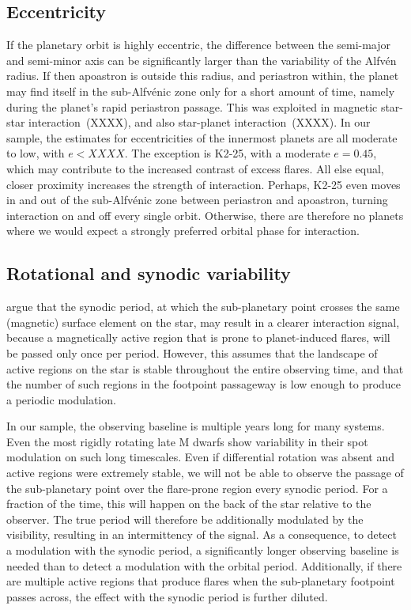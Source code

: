 \documentclass[twocolumn]{aastex631}
\begin{document}
\subsection{Eccentricity}
\label{sec:discussion:eccentricity}
If the planetary orbit is highly eccentric, the difference between the semi-major and semi-minor axis can be significantly larger than the variability of the Alfv\'en radius. If then apoastron is outside this radius, and periastron within, the planet may find itself in the sub-Alfv\'enic zone only for a short amount of time, namely during the planet's rapid periastron passage. This was exploited in magnetic star-star interaction~(XXXX), and also star-planet interaction~(XXXX). In our sample, the estimates for eccentricities of the innermost planets are all moderate to low, with $e<XXXX$. The exception is K2-25, with a moderate $e=0.45$, which may contribute to the increased contrast of excess flares. All else equal, closer proximity increases the strength of interaction. Perhaps, K2-25 even moves in and out of the sub-Alfv\'enic zone between periastron and apoastron, turning interaction on and off every single orbit. Otherwise, there are therefore no planets where we would expect a strongly preferred orbital phase for interaction. 


\subsection{Rotational and synodic variability}
\label{sec:discussion:rotsyn}
\citet{fischer2019timevariable} argue that the synodic period, at which the sub-planetary point crosses the same (magnetic) surface element on the star, may result in a clearer interaction signal, because a magnetically active region that is prone to planet-induced flares, will be passed only once per period. However, this assumes that the landscape of active regions on the star is stable throughout the entire observing time, and that the number of such regions in the footpoint passageway is low enough to produce a periodic modulation. 

In our sample, the observing baseline is multiple years long for many systems. Even the most rigidly rotating late M dwarfs show variability in their spot modulation on such long timescales. Even if differential rotation was absent and active regions were extremely stable, we will not be able to observe the passage of the sub-planetary point over the flare-prone region every synodic period. For a fraction of the time, this will happen on the back of the star relative to the observer. The true period will therefore be additionally modulated by the visibility, resulting in an intermittency of the signal. As a consequence, to detect a modulation with the synodic period, a significantly longer observing baseline is needed than to detect a modulation with the orbital period. Additionally, if there are multiple active regions that produce flares when the sub-planetary footpoint passes across, the effect with the synodic period is further diluted. 
\end{document}
